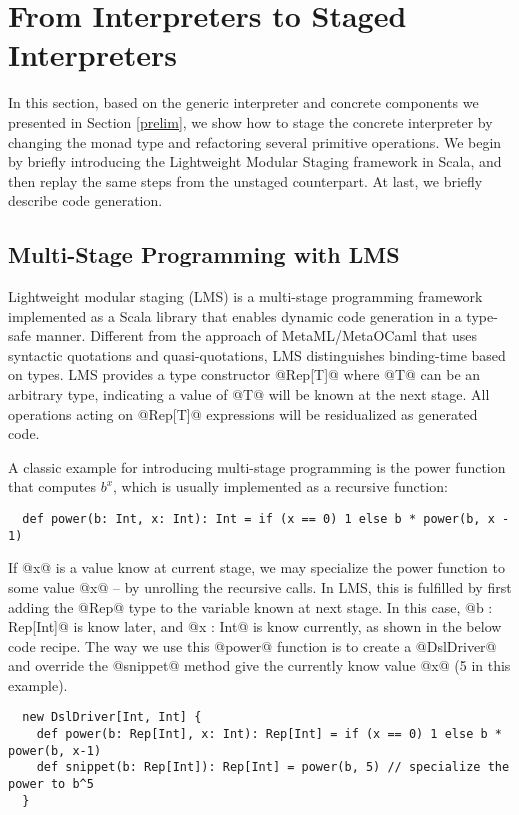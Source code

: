 \section{From Interpreters to Staged Interpreters} \label{stagedinterp}

In this section, based on the generic interpreter and concrete components we
presented in Section \ref{prelim}, we show how to stage the concrete interpreter
by changing the monad type and refactoring several primitive operations. We
begin by briefly introducing the Lightweight Modular Staging framework in Scala,
and then replay the same steps from the unstaged counterpart. At last, we briefly
describe code generation.

\subsection{Multi-Stage Programming with LMS}

Lightweight modular staging (LMS) \cite{DBLP:conf/gpce/RompfO10} is a
multi-stage programming framework implemented as a Scala library that enables
dynamic code generation in a type-safe manner. Different from the approach of
MetaML/MetaOCaml \cite{DBLP:conf/flops/Kiselyov14, DBLP:conf/gpce/CalcagnoTHL03} that
uses syntactic quotations and quasi-quotations, LMS distinguishes binding-time
based on types. LMS provides a type constructor @Rep[T]@ where @T@ can be
an arbitrary type, indicating a value of @T@ will be known at the next stage.
All operations acting on @Rep[T]@ expressions will be residualized as generated
code.

A classic example for introducing multi-stage programming is the power function
that computes $b^x$, which is usually implemented as a recursive function:
\begin{lstlisting}
  def power(b: Int, x: Int): Int = if (x == 0) 1 else b * power(b, x - 1)
\end{lstlisting}

If @x@ is a value know at current stage, we may specialize the power function to
some value @x@ -- by unrolling the recursive calls. In LMS, this is fulfilled by
first adding the @Rep@ type to the variable known at next stage. In this case,
@b : Rep[Int]@ is know later, and @x : Int@ is know currently, as shown in the
below code recipe.
The way we use this @power@ function is to create a @DslDriver@ and override the
@snippet@ method give the currently know value @x@ (5 in this example).
\begin{lstlisting}
  new DslDriver[Int, Int] {
    def power(b: Rep[Int], x: Int): Rep[Int] = if (x == 0) 1 else b * power(b, x-1)
    def snippet(b: Rep[Int]): Rep[Int] = power(b, 5) // specialize the power to b^5
  }
\end{lstlisting}

